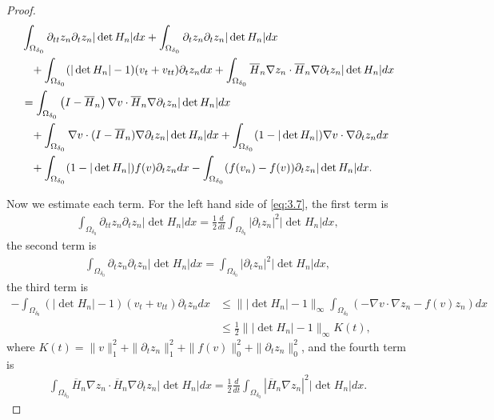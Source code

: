 \documentclass[10pt,a4paper]{amsart}
\begin{document}
\begin{proof}
\begin{align}\label{eq:3.7}
    &\int_{\Omega_{\delta_0}}\partial_{tt}z_n \partial_tz_n |\det H_n| dx+\int_{\Omega_{\delta_0}}\partial_{t}z_n \partial_tz_n |\det H_n| dx\\
&\;\;\;+\int_{\Omega_{\delta_0}}(|\det H_n|-1)(v_t+v_{tt}) \partial_tz_n dx +\int_{\Omega_{\delta_0}}\overline{H}_n\nabla z_n \cdot \overline{H}_n\nabla \partial_t z_n |\det H_n| dx\notag\\
&=\int_{\Omega_{\delta_0}}\left(I-\overline{H}_n\right)\nabla v \cdot \overline{H}_n\nabla \partial_tz_n |\det H_n| dx\notag\\
&\;\;\;+\int_{\Omega_{\delta_0}}\nabla v \cdot (I-\overline{H}_n)\nabla \partial_tz_n |\det H_n|dx+\int_{\Omega_{\delta_0}}(1-|\det H_n|)\nabla v\cdot \nabla \partial_tz_ndx\notag\\
&\;\;\;+\int_{\Omega_{\delta_0}}(1-|\det H_n|)f(v) \partial_tz_ndx-\int_{\Omega_{\delta_0}} (f(v_n)-f(v)) \partial_tz_n|\det H_n| dx\notag.
\end{align}

Now we estimate each term. For the left hand side of \eqref{eq:3.7}, the first term is
\begin{align*}
    \int_{\Omega_{\delta_0}}\partial_{tt}z_n \partial_tz_n |\det H_n| dx = \frac{1}{2} \frac{d}{dt}\int_{\Omega_{\delta_0}}\left|\partial_t z_n\right|^2 |\det H_n| dx,
\end{align*}
the second term is
\begin{align*}
    \int_{\Omega_{\delta_0}}\partial_t z_n \partial_tz_n |\det H_n| dx = \int_{\Omega_{\delta_0}}\left|\partial_t z_n\right|^2 |\det H_n| dx,
\end{align*}
the third term is
\begin{align*}
    - \int_{\Omega_{\delta_0}}(|\det H_n|-1)(v_t+v_{tt}) \partial_tz_n dx
    &\leq \||\det H_n| -1\|_{\infty} \int_{\Omega_{\delta_0}}\left(- \nabla v\cdot \nabla z_n - f(v) z_n \right)dx\\
    &\leq \frac{1}{2}\||\det H_n| -1\|_{\infty} K(t),
\end{align*}
where $K(t) = \|v\|_1^2 + \|\partial_t z_n\|^2_1 +\|f(v)\|^2_0 +\|\partial_t z_n\|^2_0$, 
and the fourth term is
\begin{align*}
    \int_{\Omega_{\delta_0}}\overline{H}_n\nabla z_n \cdot \overline{H}_n\nabla \partial_t z_n |\det H_n| dx = \frac{1}{2} \frac{d}{dt}\int_{\Omega_{\delta_0}}|\overline{H}_n\nabla z_n|^2|\det H_n|dx.
\end{align*}


\end{proof}
\end{document}
